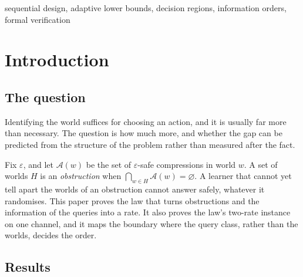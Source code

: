 \begin{IEEEkeywords}
sequential design, adaptive lower bounds, decision regions, information orders, formal
verification
\end{IEEEkeywords}

\section{Introduction}
\label{sec:intro}

\subsection{The question}

Identifying the world suffices for choosing an action, and it is usually far more than
necessary. The question is how much more, and whether the gap can be predicted from the
structure of the problem rather than measured after the fact.

Fix $\varepsilon$, and let $\mathcal A(w)$ be the set of $\varepsilon$-safe compressions in
world $w$. A set of worlds $H$ is an \emph{obstruction} when
$\bigcap_{w\in H}\mathcal A(w)=\varnothing$. A learner that cannot yet tell apart the worlds of
an obstruction cannot answer safely, whatever it randomises. This paper proves the law that
turns obstructions and the information of the queries into a rate. It also proves the law's
two-rate instance on one channel, and it maps the boundary where the query class, rather than
the worlds, decides the order.

\subsection{Results}

